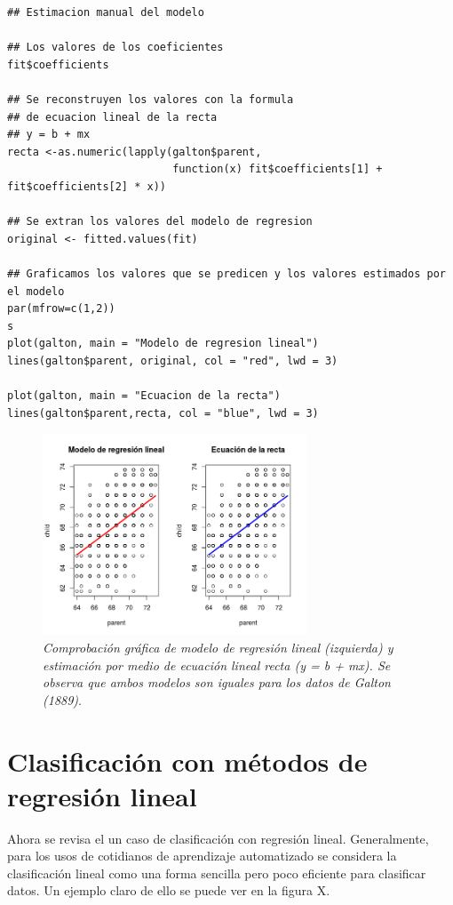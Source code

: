 \documentclass[letterpaper,12pt, spanish, oneside]{book} %
\begin{document}
\begin{lstlisting}
## Estimacion manual del modelo

## Los valores de los coeficientes
fit$coefficients

## Se reconstruyen los valores con la formula
## de ecuacion lineal de la recta
## y = b + mx
recta <-as.numeric(lapply(galton$parent,
                          function(x) fit$coefficients[1] + fit$coefficients[2] * x))

## Se extran los valores del modelo de regresion
original <- fitted.values(fit)

## Graficamos los valores que se predicen y los valores estimados por el modelo
par(mfrow=c(1,2))
s
plot(galton, main = "Modelo de regresion lineal")
lines(galton$parent, original, col = "red", lwd = 3)

plot(galton, main = "Ecuacion de la recta")
lines(galton$parent,recta, col = "blue", lwd = 3)
\end{lstlisting}

\begin{figure}[H]
\centering
\includegraphics[width=0.7\textwidth]{galton2.png}
\caption{\label{fig:frog2}\textit{Comprobación gráfica de modelo de regresión lineal (izquierda) y estimación por medio de ecuación lineal recta (y = b + mx). Se observa que ambos modelos son iguales para los datos de Galton (1889)}.}
\end{figure}

\section{Clasificación con métodos de regresión lineal}

Ahora se revisa el un caso de clasificación con regresión lineal. Generalmente, para los usos de cotidianos de aprendizaje automatizado se considera la clasificación lineal como una forma sencilla pero poco eficiente para clasificar datos. Un ejemplo claro de ello se puede ver en la figura X. 
\end{document}
